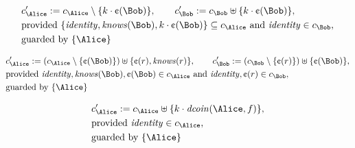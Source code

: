 \begin{align*}
&
c'_
{
\Alice
}
 := 
c_
{
\Alice
}
 \setminus 
\{
k
\cdot
\text{\textcent}
(
\Bob
)
\}
, \qquad 
c'_
{
\Bob
}
 := 
c_
{
\Bob
}
 \uplus 
\{
k
\cdot
\text{\textcent}
(
\Bob
)
\}
,\\
&
\text{provided } 
\{
\mathit{
identity
}
,
\mathit{
knows
}
(
\Bob
)
,
k
\cdot
\text{\textcent}
(
\Bob
)
\}
 \subseteq c_
{
\Alice
}
 \text{ and } 
\mathit{
identity
}
 \in c_
{
\Bob
}
,\\
&
\text{guarded by } \{
\Alice
\}
\end{align*}

\begin{align*}
&
c'_
{
\Alice
}
 := 
(c_
{
\Alice
}
 \setminus 
\{
\text{\textcent}
(
\Bob
)
\}
) \uplus 
\{
\text{\textcent}
(
r
)
,
\mathit{
knows
}
(
r
)
\}
, \qquad 
c'_
{
\Bob
}
 := 
(c_
{
\Bob
}
 \setminus 
\{
\text{\textcent}
(
r
)
\}
) \uplus 
\{
\text{\textcent}
(
\Bob
)
\}
,\\
&
\text{provided } 
\mathit{
identity
}
,
\mathit{
knows
}
(
\Bob
)
,
\text{\textcent}
(
\Bob
)
 \in c_
{
\Alice
}
 \text{ and } 
\mathit{
identity
}
,
\text{\textcent}
(
r
)
 \in c_
{
\Bob
}
,\\
&
\text{guarded by } \{
\Alice
\}
\end{align*}

\begin{align*}
&
c'_
{
\Alice
}
 := 
c_
{
\Alice
}
 \uplus 
\{
k
\cdot
\mathit{
dcoin
}
(
\Alice
,
f
)
\}
,\\
&
\text{provided } 
\mathit{
identity
}
 \in c_
{
\Alice
}
,\\
&
\text{guarded by } \{
\Alice
\}
\end{align*}

